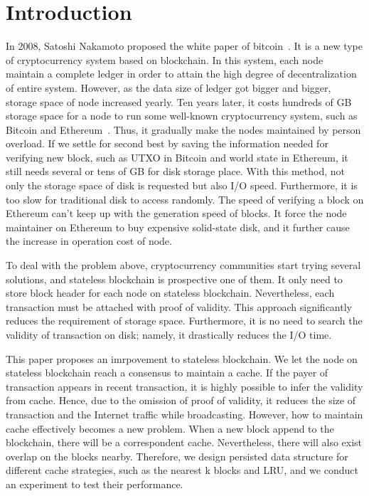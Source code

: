 \documentclass[conference]{IEEEtran}
\begin{document}
\section{Introduction}
In 2008, Satoshi Nakamoto proposed the white paper
of bitcoin~\cite{b3}. It is a new type of cryptocurrency
system based on blockchain. In this system, each node
maintain a complete ledger in order to attain the
high degree of decentralization of entire system.
However, as the data size of ledger got bigger and bigger,
storage space of node increased yearly. Ten years later,
it costs hundreds of GB storage space for a node to run
some well-known cryptocurrency system, such as Bitcoin and
Ethereum~\cite{b4}. Thus, it gradually make the nodes maintained
by person overload. If we settle for second best by saving the
information needed for verifying new block, such as UTXO in
Bitcoin and world state in Ethereum, it still needs
several or tens of GB for disk storage place. With
this method, not only the storage space of disk is
requested but also  I/O speed. Furthermore, it is
too slow for traditional disk to access randomly.
The speed of verifying a block on Ethereum can't keep
up with the generation speed of blocks. It force the node
maintainer on Ethereum to buy expensive solid-state disk,
and it further cause the increase in operation cost of node.

To deal with the problem above, cryptocurrency communities
start trying several solutions, and stateless blockchain
is prospective one of them. It only need to store
block header for each node on stateless blockchain.
Nevertheless, each transaction must be attached with
proof of validity. This approach significantly reduces
the requirement of storage space. Furthermore, it is
no need to search the validity of transaction on disk;
namely, it drastically reduces the I/O time.

This paper proposes an imrpovement to stateless blockchain.
We let the node on stateless blockchain reach a consensus
to maintain a cache. If the payer of transaction appears
in recent transaction, it is highly possible to infer
the validity from cache. Hence, due to the omission of
proof of validity, it reduces the size of transaction and
the Internet traffic while broadcasting. However, how
to maintain cache effectively becomes a new problem.
When a new block append to the blockchain, there will be
a correspondent cache. Nevertheless, there will
also exist overlap on the blocks nearby.
Therefore, we design persisted data structure
for different cache strategies, such as the
nearest k blocks and LRU, and we conduct an
experiment to test their performance.
\end{document}
